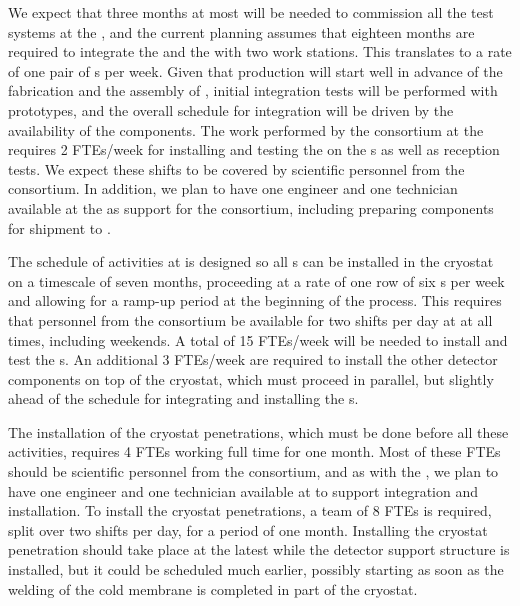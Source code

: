 We expect that three months at most will be needed to commission
all the test systems at the , and the current planning
assumes that eighteen months are required to integrate the 
and the  with two work stations. This translates to
a rate of one pair of s per week. Given that 
production will start well in advance of the  fabrication
and the assembly of , initial integration tests will 
be performed with  prototypes, and the overall schedule
for integration will be driven by the availability of the 
components. The work performed by the 
consortium at the  requires 2 FTEs/week for installing and testing
the  on the s as well as  
 reception tests. We expect these shifts to be covered 
by scientific personnel from the  consortium. In addition, 
we plan to have one engineer and one technician available at the 
 as support for the consortium, including 
preparing components for shipment to .

The schedule of activities at  is designed so all 
s can be installed in the cryostat on a timescale of seven
months, proceeding at a rate of one row of six s per week and
allowing for a ramp-up period at the beginning of the process. This
requires that personnel from the  consortium be available
for two shifts per day at  at all times, including weekends. A
total of 15 FTEs/week will be needed to install and test the s. An additional 3 FTEs/week are
required to install the other detector components on
top of the cryostat, which must proceed in parallel, but slightly
ahead of the schedule for integrating and installing the
s. 

The installation of the cryostat penetrations, which must be done before all these activities, requires 4 FTEs working full time
for one month. Most of these FTEs should be scientific personnel from
the  consortium, and as with the , we plan
to have one engineer and one technician available at  to support
integration and installation. To install
the cryostat penetrations, a team of 8 FTEs is required, split over
two shifts per day, for a period of one month. Installing
the cryostat penetration should take place at the latest while the 
detector support structure is installed, but it could be
scheduled much earlier, possibly starting as soon
as the welding of the cold membrane is completed in part of the cryostat.

